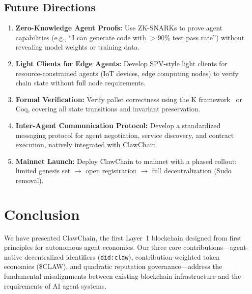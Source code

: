 \documentclass{article}
\begin{document}
\subsection{Future Directions}

\begin{enumerate}
    \item \textbf{Zero-Knowledge Agent Proofs:} Use ZK-SNARKs to prove agent capabilities (e.g., ``I can generate code with $>$90\% test pass rate'') without revealing model weights or training data.
    
    \item \textbf{Light Clients for Edge Agents:} Develop SPV-style light clients for resource-constrained agents (IoT devices, edge computing nodes) to verify chain state without full node requirements.
    
    \item \textbf{Formal Verification:} Verify pallet correctness using the K framework~\cite{rosu2010kframework} or Coq, covering all state transitions and invariant preservation.
    
    \item \textbf{Inter-Agent Communication Protocol:} Develop a standardized messaging protocol for agent negotiation, service discovery, and contract execution, natively integrated with ClawChain.
    
    \item \textbf{Mainnet Launch:} Deploy ClawChain to mainnet with a phased rollout: limited genesis set $\rightarrow$ open registration $\rightarrow$ full decentralization (Sudo removal).
\end{enumerate}


\section{Conclusion}\label{sec:conclusion}

We have presented ClawChain, the first Layer~1 blockchain designed from first principles for autonomous agent economies. Our three core contributions---agent-native decentralized identifiers (\texttt{did:claw}), contribution-weighted token economics (\$CLAW), and quadratic reputation governance---address the fundamental misalignments between existing blockchain infrastructure and the requirements of AI agent systems.
\end{document}
